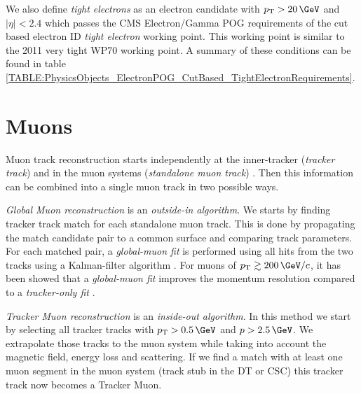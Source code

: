 

We also define \textit{tight electrons} as an electron candidate with $\pt>20\,\GeV$ and $|\eta|<2.4$ which passes the \gls{CMS} Electron/Gamma \gls{POG} requirements of the cut based electron \gls{ID} \textit{tight electron} working point. This working point is similar to the 2011 very tight WP70 working point. A summary of these conditions can be found in table \ref{TABLE:PhysicsObjects_ElectronPOG_CutBased_TightElectronRequirements}.



\section{Muons}
\label{SECTION:EventReconstructionAndSimulation_Muons}


Muon track reconstruction starts independently at the inner-tracker (\textit{tracker track}) and in the muon systems (\textit{standalone muon track}) \cite{ARTICLE:CMSMuonReconstruction7TeV}. Then this information can be combined into a single muon track in two possible ways.

\textit{Global Muon reconstruction} is an \textit{outside-in algorithm}. We starts by finding tracker track match for each standalone muon track. This is done by propagating the match candidate pair to a common surface and comparing track parameters. For each matched pair, a \textit{global-muon fit} is performed using all hits from the two tracks using a Kalman-filter algorithm \cite{ARTICLE:KalmanFilteringTrackVertexFitting}. For muons of $\pt\gtrsim 200\,\GeV/c$, it has been showed that a \textit{global-muon fit} improves the momentum resolution compared to a \textit{tracker-only fit} \cite{CMSTDR:CMSPhysicsVol1, ARTICLE:CMSPerformanceMuonReconstructionCosmicRay}.

\textit{Tracker Muon reconstruction} is an \textit{inside-out algorithm}. In this method we start by selecting all tracker tracks with $\pt>0.5\,\GeV$ and $p>2.5\,\GeV$. We extrapolate those tracks to the muon system while taking into account the magnetic field, energy loss and scattering. If we find a match with at least one muon segment in the muon system (track stub in the \gls{DT} or \gls{CSC}) this tracker track now becomes a Tracker Muon. 

